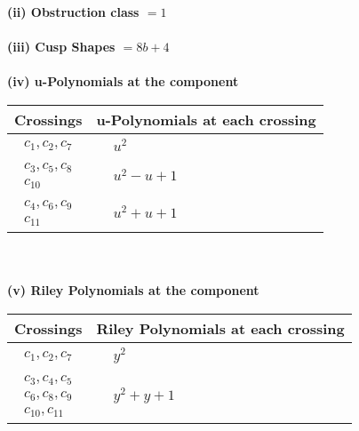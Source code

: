 \documentclass[1p]{elsarticle_modified}
\theoremstyle{definition}
\begin{document}
\flushleft \textbf{(ii) Obstruction class $= 1$}\\~\\
\flushleft \textbf{(iii) Cusp Shapes $= 8 b+4$}\\~\\
\newpage\renewcommand{\arraystretch}{1}
\flushleft \textbf{(iv) u-Polynomials at the component}\newline \\
\begin{tabular}{m{50pt}|m{274pt}}
Crossings & \hspace{64pt}u-Polynomials at each crossing \\
\hline $$\begin{aligned}c_{1},c_{2},c_{7}\end{aligned}$$&$\begin{aligned}
&u^2
\end{aligned}$\\
\hline $$\begin{aligned}c_{3},c_{5},c_{8}\\c_{10}\end{aligned}$$&$\begin{aligned}
&u^2- u+1
\end{aligned}$\\
\hline $$\begin{aligned}c_{4},c_{6},c_{9}\\c_{11}\end{aligned}$$&$\begin{aligned}
&u^2+u+1
\end{aligned}$\\
\hline
\end{tabular}\\~\\
\newpage\renewcommand{\arraystretch}{1}
\flushleft \textbf{(v) Riley Polynomials at the component}\newline \\
\begin{tabular}{m{50pt}|m{274pt}}
Crossings & \hspace{64pt}Riley Polynomials at each crossing \\
\hline $$\begin{aligned}c_{1},c_{2},c_{7}\end{aligned}$$&$\begin{aligned}
&y^2
\end{aligned}$\\
\hline $$\begin{aligned}c_{3},c_{4},c_{5}\\c_{6},c_{8},c_{9}\\c_{10},c_{11}\end{aligned}$$&$\begin{aligned}
&y^2+y+1
\end{aligned}$\\
\hline
\end{tabular}\\~\\
\end{document}
